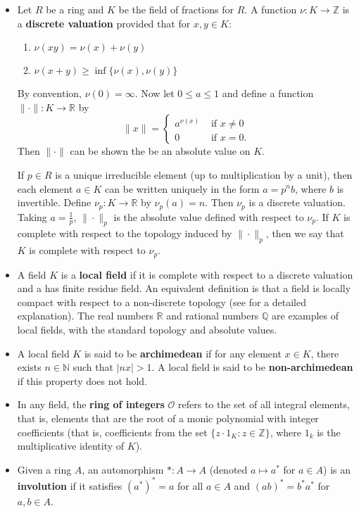 \begin{itemize}
\item Let $R$ be a ring and $K$ be the field of fractions for $R$.
A function $\nu: K \to \mathbb{Z}$ is a \textbf{discrete valuation} provided that for $x, y \in K$:
\begin{enumerate}
\item $\nu(xy) = \nu(x) + \nu(y)$
\item $\nu(x + y) \ge \inf\{\nu(x), \nu(y)\}$
\end{enumerate}
By convention, $\nu(0) = \infty$.
Now let $0 \le a \le 1$ and define a function $\|\cdot \|: K \to \mathbb{R}$ by
\[
\|x\| = \begin{cases}
a^{\nu(x)} &\text{ if } x \ne 0\\
0 &\text{ if } x = 0.
\end{cases}
\]
Then $\| \cdot \|$ can be shown the be an absolute value on $K$.

If $p \in R$ is a unique irreducible element (up to multiplication by a unit), then each element $a \in K$ 
can be written uniquely in the form $a = p^n b$, where $b$ is invertible.
Define $\nu_p: K \to \mathbb{R}$ by $\nu_p(a) = n$.
Then $\nu_p$ is a discrete valuation.
Taking $a = \frac{1}{p}$, $\| \cdot \|_p$ is the absolute value defined with respect to $\nu_p$.
If $K$ is complete with respect to the topology induced by $\| \cdot \|_p$, then we say that $K$ is complete with respect to $\nu_p$.

\item A field $K$ is a \textbf{local field} if it is complete with respect to a discrete valuation and a has finite residue field.
An equivalent definition is that a field is locally compact with respect to a non-discrete topology (see \cite{serre} for a detailed explanation).
The real numbers $\mathbb{R}$ and rational numbers $\mathbb{Q}$ are examples of local fields, with the standard topology and absolute values.

\item A local field $K$ is said to be \textbf{archimedean} if for any element $x \in K$, there exists $n \in \mathbb{N}$ such that $|nx| > 1$.
A local field is said to be \textbf{non-archimedean} if this property does not hold.

\item In any field, the \textbf{ring of integers} $\mathcal{O}$ refers to the set of all integral elements, that is, 
elements that are the root of a monic polynomial with integer coefficients 
(that is, coefficients from the set $\{z \cdot 1_K : z \in \mathbb{Z} \}$, where $1_k$ is the multiplicative identity of $K$).

\item Given a ring $A$, an automorphism $*: A \to A$ (denoted $a \mapsto a^*$ for $a \in A$) is an \textbf{involution} 
if it satisfies $(a^*)^* = a$ for all $a \in A$ and $(ab)^* = b^* a^*$ for $a, b \in A$.
\end{itemize}

